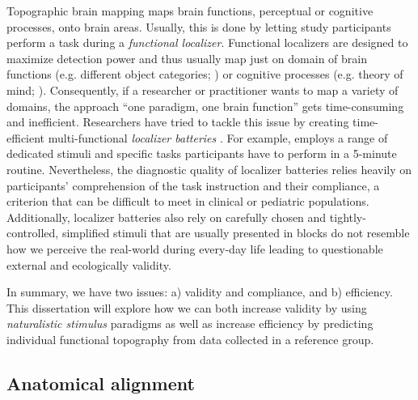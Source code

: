 


Topographic brain mapping maps brain functions, perceptual or cognitive
processes, onto brain areas.
Usually, this is done by letting study participants perform a task during a
\textit{functional localizer}.
Functional localizers are designed to maximize detection power and thus usually
map just on domain of brain functions (e.g. different object categories;
\citet{kanwisher1997ffa}) or cognitive processes (e.g. theory of mind;
\citet{spunt2014validating}).
Consequently, if a researcher or practitioner wants to map a variety of domains,
the approach ``one paradigm, one brain function'' gets time-consuming and
inefficient.
Researchers have tried to tackle this issue by creating time-efficient
multi-functional \textit{localizer batteries} \citep{pinel2007fast,
pinho2018individual, pinho2020individual}.
For example, \citet{pinel2007fast} employs a range of dedicated stimuli and
specific tasks participants have to perform in a 5-minute routine.
Nevertheless, the diagnostic quality of localizer batteries relies heavily on
participants' comprehension of the task instruction and their compliance, a
criterion that can be difficult to meet in clinical or pediatric populations.
Additionally, localizer batteries also rely on carefully chosen and
tightly-controlled, simplified stimuli that are usually presented in blocks do
not resemble how we perceive the real-world during every-day life leading to
questionable external and ecologically validity.

In summary, we have two issues: a) validity and compliance, and b) efficiency.
This dissertation will explore how we can both increase validity by using
\textit{naturalistic stimulus} paradigms as well as increase efficiency by
predicting individual functional topography from data collected in a reference
group.


\subsection{Anatomical alignment}

